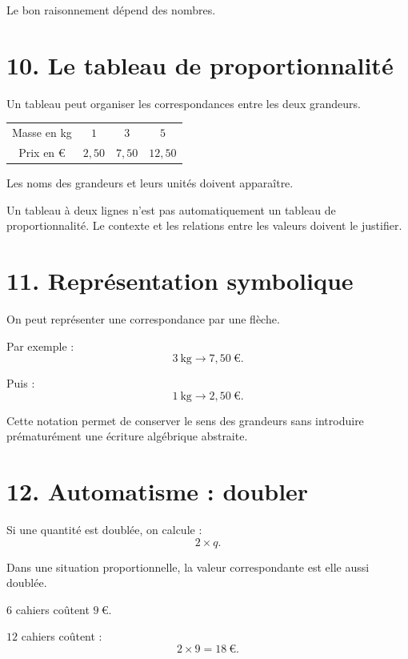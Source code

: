 Le bon raisonnement dépend des nombres.

\section{10. Le tableau de proportionnalité}

Un tableau peut organiser les correspondances entre les deux grandeurs.

\begin{tabular}{c|c|c|c}
Masse en kg & $1$ & $3$ & $5$ \\
Prix en € & $2{,}50$ & $7{,}50$ & $12{,}50$ \\
\end{tabular}

Les noms des grandeurs et leurs unités doivent apparaître.

\begin{attention}
Un tableau à deux lignes n'est pas automatiquement un tableau de proportionnalité. Le contexte et les relations entre les valeurs doivent le justifier.
\end{attention}

\section{11. Représentation symbolique}

On peut représenter une correspondance par une flèche.

Par exemple :
\[
3\ \text{kg}
\longrightarrow
7{,}50\ \text{€}.
\]

Puis :
\[
1\ \text{kg}
\longrightarrow
2{,}50\ \text{€}.
\]

Cette notation permet de conserver le sens des grandeurs sans introduire prématurément une écriture algébrique abstraite.

\section{12. Automatisme : doubler}

Si une quantité est doublée, on calcule :
\[
2\times q.
\]

Dans une situation proportionnelle, la valeur correspondante est elle aussi doublée.

\begin{exemple}
$6$ cahiers coûtent $9\ \text{€}$.

$12$ cahiers coûtent :
\[
2\times9=18\ \text{€}.
\]
\end{exemple}

